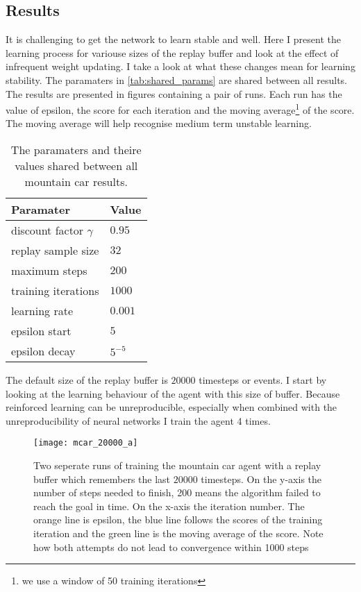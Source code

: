 \clearpage
\subsection{Results}

It is challenging to get the network to learn stable and well. Here I present the learning process for variouse sizes of the replay buffer and look at the effect of infrequent weight updating. I take a look at what these changes mean for learning stability. The paramaters in \autoref{tab:shared_params} are shared between all results. The results are presented in figures containing a pair of runs. Each run has the value of epsilon, the score for each iteration and the moving average\footnote{we use a window of 50 training iterations} of the score. The moving average will help recognise medium term unstable learning.

\begin{table}[ht]
  \centering
  \selectfont
  \begin{tabular}{ll}
    \toprule
    Paramater & Value \\
    \midrule
    discount factor $\gamma$ & $0.95$ \\
    replay sample size & $32$ \\
    maximum steps & $200$ \\
    training iterations & $1000$ \\
    learning rate & $0.001$ \\
    epsilon start & $5$ \\
    epsilon decay & $5^{-5}$ \\
    \bottomrule
  \end{tabular}
  \caption{The paramaters and theire values shared between all mountain car results.}
  \label{tab:shared_params}
\end{table}

The default size of the replay buffer is $20000$ timesteps or events. I start by looking at the learning behaviour of the agent with this size of buffer. Because reinforced learning can be unreproducible, especially when combined with the unreproducibility of neural networks I train the agent 4 times. 

\begin{figure}
    \texttt{[image: mcar\_20000\_a]}
    \caption{Two seperate runs of training the mountain car agent with a replay buffer which remembers the last $20000$ timesteps. On the y-axis the number of steps needed to finish, 200 means the algorithm failed to reach the goal in time. On the x-axis the iteration number. The orange line is epsilon, the blue line follows the scores of the training iteration and the green line is the moving average of the score. Note how both attempts do not lead to convergence within 1000 steps}
    \label{fig:mcar_20k_a}
\end{figure}

